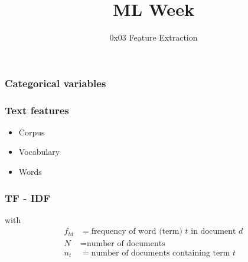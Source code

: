 
\title
{ML Week}
\subtitle{0x03 \hspace{2mm}  Feature Extraction}




\begin{frame}
  \titlepage
\end{frame}

\begin{frame}
  \frametitle{Categorical variables}

\end{frame}

\begin{frame}[t]

\end{frame}

\begin{frame}
  \frametitle{Text features}
  \begin{itemize}
  \item Corpus
  \item Vocabulary
  \item Words
  \end{itemize}
\end{frame}

\begin{frame}
\end{frame}

\begin{frame}
  \frametitle{TF - IDF}
  
  with
  \begin{align*}
    f_{td} &= \mbox{frequency of word (term) $t$ in document $d$} \\
    N &= \mbox{number of documents}\\
    n_t &= \mbox{number of documents containing term $t$}
  \end{align*}
\end{frame}


